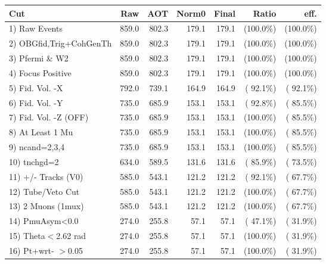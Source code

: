  \begin{table}[h!]\centering
 \begin{tabular}{||l||r|r|r|r|r|r||}
 \hline
 \hline
 Cut & Raw & AOT & Norm0 & Final & Ratio & eff.       \\
 \hline
  1) Raw Events           &        859.0 &        802.3 &        179.1 &        179.1 & (100.0\%) & (100.0\%) \\
  2) OBGfid,Trig+CohGenTh &        859.0 &        802.3 &        179.1 &        179.1 & (100.0\%) & (100.0\%) \\
  3) Pfermi \& W2         &        859.0 &        802.3 &        179.1 &        179.1 & (100.0\%) & (100.0\%) \\
  4) Focus Positive       &        859.0 &        802.3 &        179.1 &        179.1 & (100.0\%) & (100.0\%) \\
  5) Fid. Vol. -X         &        792.0 &        739.1 &        164.9 &        164.9 & ( 92.1\%) & ( 92.1\%) \\
  6) Fid. Vol. -Y         &        735.0 &        685.9 &        153.1 &        153.1 & ( 92.8\%) & ( 85.5\%) \\
  7) Fid. Vol. -Z (OFF)   &        735.0 &        685.9 &        153.1 &        153.1 & (100.0\%) & ( 85.5\%) \\
  8) At Least 1 Mu        &        735.0 &        685.9 &        153.1 &        153.1 & (100.0\%) & ( 85.5\%) \\
  9) ncand=2,3,4          &        735.0 &        685.9 &        153.1 &        153.1 & (100.0\%) & ( 85.5\%) \\
 10) tnchgd=2             &        634.0 &        589.5 &        131.6 &        131.6 & ( 85.9\%) & ( 73.5\%) \\
 11) +/- Tracks (V0)      &        585.0 &        543.1 &        121.2 &        121.2 & ( 92.1\%) & ( 67.7\%) \\
 12) Tube/Veto Cut        &        585.0 &        543.1 &        121.2 &        121.2 & (100.0\%) & ( 67.7\%) \\
 13) 2 Muons (1mux)       &        585.0 &        543.1 &        121.2 &        121.2 & (100.0\%) & ( 67.7\%) \\
 14) PmuAsym<0.0          &        274.0 &        255.8 &         57.1 &         57.1 & ( 47.1\%) & ( 31.9\%) \\
 15) Theta$<$2.62 rad     &        274.0 &        255.8 &         57.1 &         57.1 & (100.0\%) & ( 31.9\%) \\
 16) Pt+wrt- $>$0.05      &        274.0 &        255.8 &         57.1 &         57.1 & (100.0\%) & ( 31.9\%) \\

\end{tabular}
\end{table}
